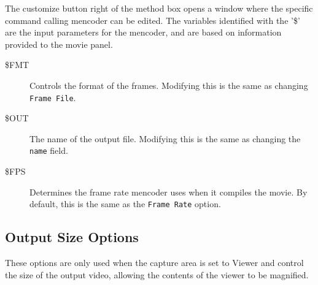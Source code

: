 \documentclass{article}
\begin{document}
The customize button right of the method box opens a window where the
specific command calling mencoder can be edited. The variables
identified with the '\$' are the input parameters for the mencoder,
and are based on information provided to the movie panel.

\begin{description}

\item[\$FMT]\mbox{}

Controls the format of the frames. Modifying this is the same as
changing {\tt Frame File}.

\item[\$OUT]\mbox{}
 
The name of the output file. Modifying this is the same as
changing the {\tt name} field.

\item[\$FPS]\mbox{}

Determines the frame rate mencoder uses when it compiles the
movie. By default, this is the same as the {\tt Frame Rate} option.

\end{description}

\subsection{Output Size Options}

These options are only used when the capture area is set to {\sf Viewer} and
control the size of the output video, allowing the contents of the viewer
to be magnified.
\end{document}
